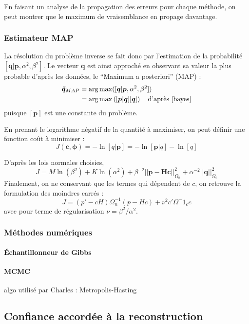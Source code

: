 En faisant un analyse de la propagation des erreurs pour chaque méthode, on peut montrer que le maximum de vraisemblance en propage davantage.\\

\subsubsection{Estimateur MAP}
La résolution du problème inverse se fait donc par l'estimation de la probabilité $[\bm{q}|\bm{p},\alpha^2,\beta^2]$. Le vecteur $\bm{q}$ est ainsi approché en observant sa valeur la plus probable d'après les données, le  ``Maximum a posteriori'' (MAP) : 
\begin{align}
\bm{\tilde{q}}_{MAP} &= \arg\max([\bm{q}|\bm{p},\alpha^2,\beta^2])\\
					 &= \arg\max\left( [\bm{p}|\bm{q}][\bm{q}]  \right) ~~~\text{d'après \ref{bayes}}
\end{align}
puisque $[\bm{p}]$ est une constante du problème.

En prenant le logarithme négatif de la quantité à maximiser, on peut définir une fonction coût à minimiser : 
\begin{equation}
	J(\bm{c},\bm{\phi}) = - \ln[q|\bm{p}] = -\ln[\bm{p}|q]-\ln[q]
\end{equation}

D'après les lois normales choisies, 
\begin{equation}
J=M\ln(\beta^2) + K\ln(\alpha^2) +\beta^{-2}||\bm{p}-\bm{Hc}||^2_{\Omega_n}+\alpha^{-2}||\bm{q}||^2_{\Omega_c}
\end{equation}
Finalement, on ne conservant que les termes qui dépendent de $c$, on retrouve la formulation des moindres carrés : 
\begin{equation}
 J = (p'-cH)\Omega^{-1}_n(p-Hc) + \nu^2c'\Omega^-1_c c
\end{equation}
avec pour terme de régularisation $\nu = \beta^2/\alpha^2$.


\subsubsection{Méthodes numériques}
\paragraph{Échantillonneur de Gibbs}

\paragraph{MCMC}
algo utilisé par Charles : Metropolis-Hasting


\subsection{Confiance accordée à la reconstruction}

	

